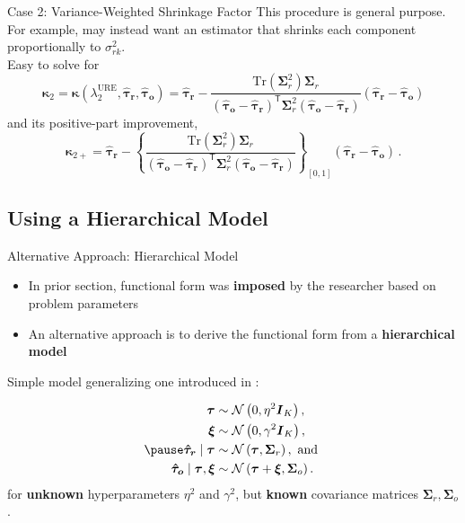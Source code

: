 \documentclass[usenames,dvipsnames]{beamer}
\newcommand{\bstau}{\boldsymbol{\tau}}
\newcommand{\htaur}{\boldsymbol{\hat \tau_r}}
\newcommand{\htauo}{\boldsymbol{\hat \tau_o}}
\newcommand{\bsxi}{\boldsymbol{\xi}}
\newcommand{\bsD}{\boldsymbol{W}}
\newcommand{\bsSig}{\boldsymbol{\Sigma}}
\newcommand{\ident}{\boldsymbol{I}}
\newcommand{\bskap}{\boldsymbol{ \kappa}}
\newcommand{\Tr}{\text{Tr}}
\newcommand{\URE}{\text{URE}}
\newcommand{\tauu}{\boldsymbol{\hat \tau_r}}
\newcommand{\taub}{\boldsymbol{\hat \tau_o}}
\let\oldcite=\cite
\renewcommand{\cite}[1]{\textcolor[rgb]{.3,.3,.8}{\oldcite{#1}}}
\newcommand{\tran}{\mathsf{T}}
\theoremstyle{definition} %
\begin{document}
\begin{frame}{Case 2: Variance-Weighted Shrinkage Factor}
This procedure is general purpose. For example, may instead want an estimator that shrinks each component proportionally to $\sigma_{rk}^2$.\\ 
\vspace{5mm} Easy to solve for
\[ \bskap_2 = \bskap(\lambda_2^{\URE}, \htaur, \htauo) = \htaur -  \frac{\Tr(\bsSig_r^2 )\bsSig_r}{(\htauo - \htaur)^\tran  \bsSig_r^2 (\htauo - \htaur) } \left( \htaur - \htauo \right) \]
and its positive-part improvement,
\[ \bskap_{2+} = \htaur - \left\{ \frac{\Tr(\bsSig_r^2 )\bsSig_r}{(\htauo - \htaur)^\tran  \bsSig_r^2 (\htauo - \htaur) } \right\}_{[0, 1]} \left( \htaur - \htauo \right) \,.\]
\end{frame}

\subsection{Using a Hierarchical Model}

\begin{frame}{Alternative Approach: Hierarchical Model}

\begin{itemize}
\item In prior section, functional form was \textbf{imposed} by the researcher based on problem parameters 
\item An alternative approach is to derive the functional form from a \textbf{hierarchical model } \pause
\end{itemize}

Simple model generalizing one introduced in \cite{green1991james}:

\begin{equation}\label{eq:obsData}
\begin{aligned}
\bstau &\sim \mathcal{N} \left(0, \eta^2 \ident_K \right), \\
\bsxi & \sim \mathcal{N} \left(0, \gamma^2 \ident_K \right), \\ \pause
\tauu \mid \bstau & \sim \mathcal{N} \left( \bstau, \bsSig_r \right), \text{ and } \\
\taub \mid \bstau, \bsxi &\sim \mathcal{N} \left( \bstau + \bsxi, \bsSig_o \right) .
\end{aligned}
\end{equation}
for \textbf{unknown} hyperparameters $\eta^2$ and $\gamma^2$, but \textbf{known} covariance matrices $\bsSig_r, \bsSig_o$. 

\end{frame}
\end{document}
